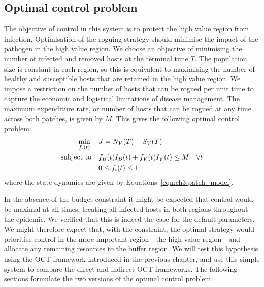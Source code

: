 \subsection{Optimal control problem}

The objective of control in this system is to protect the high value region from infection. Optimisation of the roguing strategy should minimise the impact of the pathogen in the high value region. We choose an objective of minimising the number of infected and removed hosts at the terminal time $T$. The population size is constant in each region, so this is equivalent to maximising the number of healthy and susceptible hosts that are retained in the high value region. We impose a restriction on the number of hosts that can be rogued per unit time to capture the economic and logistical limitations of disease management. The maximum expenditure rate, or number of hosts that can be rogued at any time across both patches, is given by $M$. This gives the following optimal control problem:
\begin{subequations}\label{eqn:ch3:opt_problem}
    \begin{align}
        \min_{f_i(t)} \quad{} &\null J = N_V(T) - S_V(T) \label{eqn:ch3:opt_problem_a}\\
        \text{subject to} \quad{} &\null f_B(t)I_B(t) + f_V(t)I_V(t) \leq M \quad \forall t \label{eqn:ch3:opt_problem_b}\\
        &\null 0\leq f_i(t) \leq 1\label{eqn:ch3:opt_problem_c}
    \end{align}
\end{subequations}
where the state dynamics are given by Equations~\ref{eqn:ch3:patch_model}.

In the absence of the budget constraint it might be expected that control would be maximal at all times, treating all infected hosts in both regions throughout the epidemic. We verified that this is indeed the case for the default parameters. We might therefore expect that, with the constraint, the optimal strategy would prioritise control in the more important region---the high value region---and allocate any remaining resources to the buffer region. We will test this hypothesis using the OCT framework introduced in the previous chapter, and use this simple system to compare the direct and indirect OCT frameworks. The following sections formulate the two versions of the optimal control problem.

